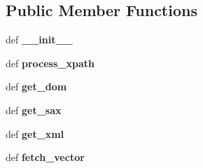 \subsection*{Public Member Functions}
\begin{DoxyCompactItemize}
\item 
\hypertarget{classcheshire3_1_1record_1_1_marc_record_a223dce7217bb7d3736de9c1e2c53c06c}{def {\bfseries \-\_\-\-\_\-init\-\_\-\-\_\-}}\label{classcheshire3_1_1record_1_1_marc_record_a223dce7217bb7d3736de9c1e2c53c06c}

\item 
\hypertarget{classcheshire3_1_1record_1_1_marc_record_a9fe5e043f6566bacd8a5b449d0ab72fe}{def {\bfseries process\-\_\-xpath}}\label{classcheshire3_1_1record_1_1_marc_record_a9fe5e043f6566bacd8a5b449d0ab72fe}

\item 
\hypertarget{classcheshire3_1_1record_1_1_marc_record_a8b7cca2215efc1324b054e843cdb8ef7}{def {\bfseries get\-\_\-dom}}\label{classcheshire3_1_1record_1_1_marc_record_a8b7cca2215efc1324b054e843cdb8ef7}

\item 
\hypertarget{classcheshire3_1_1record_1_1_marc_record_a81696dc32fbf49c4a53cf1b4e06eaed8}{def {\bfseries get\-\_\-sax}}\label{classcheshire3_1_1record_1_1_marc_record_a81696dc32fbf49c4a53cf1b4e06eaed8}

\item 
\hypertarget{classcheshire3_1_1record_1_1_marc_record_a57a16975064187a3d2f1894191aa724d}{def {\bfseries get\-\_\-xml}}\label{classcheshire3_1_1record_1_1_marc_record_a57a16975064187a3d2f1894191aa724d}

\item 
\hypertarget{classcheshire3_1_1record_1_1_marc_record_adc7163583586d8ae73b0387ebe7e1870}{def {\bfseries fetch\-\_\-vector}}\label{classcheshire3_1_1record_1_1_marc_record_adc7163583586d8ae73b0387ebe7e1870}

\end{DoxyCompactItemize}

